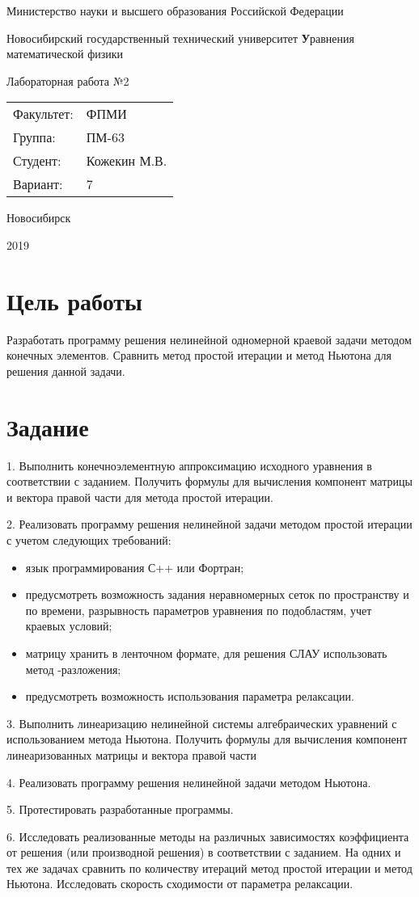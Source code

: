 \documentclass[12pt, a4paper]{article}
\newcommand{\insertTitle}[6]{
\begin{titlepage}
	\begin{center}
    	\large
		Министерство науки и высшего образования Российской Федерации
		
		Новосибирский государственный технический университет
		\vfill
		{\textbf #1}
		
		Лабораторная работа №#2
		\vfill
	\end{center}
	
	\begin{tabular}{ m{7em}  m{7em} }
	Факультет: & ФПМИ \\ 
	Группа: & #3 \\  
	Студент: & #4 \\
	Вариант: & #5
	\end{tabular}
	\vfill

\begin{center}
Новосибирск

#6
\end{center}
\end{titlepage}
}
\begin{document}
\setlength{\abovedisplayskip}{1pt}
\setlength{\belowdisplayskip}{1pt}

\insertTitle{Уравнения математической физики}{2}{ПМ-63}{Кожекин М.В.}{7}{2019}


\section{Цель работы}
Разработать программу решения нелинейной одномерной краевой задачи методом конечных элементов. Сравнить метод простой итерации и метод Ньютона для решения данной задачи.


\section{Задание}
1.	Выполнить конечноэлементную аппроксимацию исходного уравнения в соответствии с заданием. Получить формулы для вычисления компонент матрицы и вектора правой части   для метода простой итерации. 

2.	Реализовать программу решения нелинейной задачи методом простой итерации с учетом следующих требований:
\begin{itemize}[noitemsep]
\item язык программирования С++ или Фортран;
\item предусмотреть возможность задания неравномерных сеток по пространству и  по времени, разрывность параметров уравнения по подобластям, учет краевых условий;
\item матрицу хранить в ленточном формате, для решения СЛАУ использовать метод  -разложения;
\item предусмотреть возможность использования параметра релаксации.
\end{itemize}

3.	Выполнить линеаризацию нелинейной системы алгебраических уравнений с использованием метода Ньютона. Получить формулы для вычисления компонент линеаризованных матрицы   и вектора правой части  

4.	Реализовать программу решения нелинейной задачи методом Ньютона.

5.	Протестировать разработанные программы.

6.	Исследовать реализованные методы на различных зависимостях коэффициента от решения (или производной решения) в соответствии с заданием. На одних и тех же задачах сравнить по количеству итераций метод простой итерации и метод Ньютона. Исследовать скорость сходимости от параметра релаксации.
\end{document}
